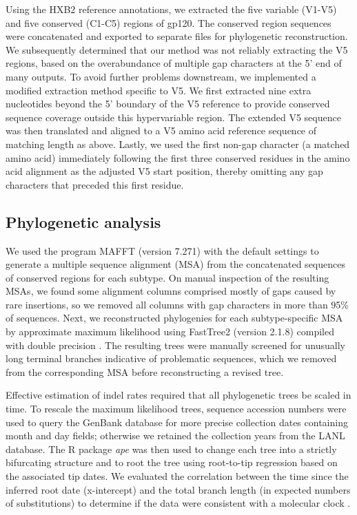 \documentclass[12pt]{article}
\begin{document}
Using the HXB2 reference annotations, we extracted the five variable (V1-V5) and five conserved (C1-C5) regions of gp120.  
The conserved region sequences were concatenated and exported to separate files for phylogenetic reconstruction.
We subsequently determined that our method was not reliably extracting the V5 regions, based on the overabundance of multiple gap characters at the 5' end of many outputs. 
To avoid further problems downstream, we implemented a modified extraction method specific to V5.
We first extracted nine extra nucleotides beyond the 5' boundary of the V5 reference to provide conserved sequence coverage outside this hypervariable region. 
The extended V5 sequence was then translated and aligned to a V5 amino acid reference sequence of matching length as above. 
Lastly, we used the first non-gap character (a matched amino acid) immediately following the first three conserved residues in the amino acid alignment as the adjusted V5 start position, thereby omitting any gap characters that preceded this first residue.  



\subsection * {Phylogenetic analysis}

We used the program MAFFT (version 7.271) with the default settings \citep{Katoh:2013} to generate a multiple sequence alignment (MSA) from the concatenated sequences of conserved regions for each subtype.
On manual inspection of the resulting MSAs, we found some alignment columns comprised mostly of gaps caused by rare insertions, so we removed all columns with gap characters in more than 95\% of sequences.
Next, we reconstructed phylogenies for each subtype-specific MSA by approximate maximum likelihood using FastTree2 (version 2.1.8) compiled with double precision \citep{Price:2010}.
The resulting trees were manually screened for unusually long terminal branches indicative of problematic sequences, which we removed from the corresponding MSA before reconstructing a revised tree.

Effective estimation of indel rates required that all phylogenetic trees be scaled in time. 
To rescale the maximum likelihood trees, sequence accession numbers were used to query the GenBank database for more precise collection dates containing month and day fields; otherwise we retained the collection years from the LANL database. 
The R package \textit{ape} was then used to change each tree into a strictly bifurcating structure and to root the tree using root-to-tip regression \citep{Paradis:2004} based on the associated tip dates.
We evaluated the correlation between the time since the inferred root date (x-intercept) and the total branch length (in expected numbers of substitutions) to determine if the data were consistent with a molecular clock \citep{drummond2003inference}.
\end{document}
